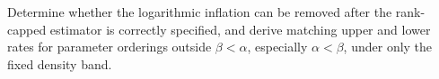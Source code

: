 Determine whether the logarithmic inflation can be removed after the rank-capped estimator is correctly specified, and derive matching upper and lower rates for parameter orderings outside \(\beta<\alpha\), especially \(\alpha<\beta\), under only the fixed density band.